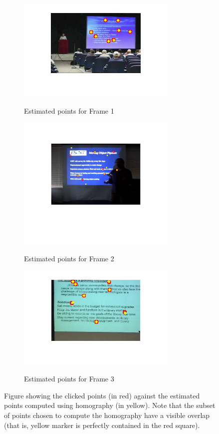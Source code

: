 \clearpage
\begin{figure}[ht]
	\begin{subfigure}{0.4\textwidth}
	    {\includegraphics[width=3in]{new_figs/fBSF1.jpg}}
		\caption{Estimated points for Frame 1}
	\end{subfigure}
	\begin{subfigure}{0.4\textwidth}
	    {\includegraphics[width=3in]{new_figs/fBSF2.jpg}}
		\caption{Estimated points for Frame 2}
	\end{subfigure}
	\begin{subfigure}{0.4\textwidth}
	    {\includegraphics[width=3in]{new_figs/fBSF3.jpg}}
		\caption{Estimated points for Frame 3}
	\end{subfigure}
	\caption{Figure showing the clicked points (in red) against the estimated points computed using homography (in yellow). Note that the subset of points chosen to compute the homography have a visible overlap (that is, yellow marker is perfectly contained in the red square).}
	\label{fig:slideframe_est}
\end{figure}

